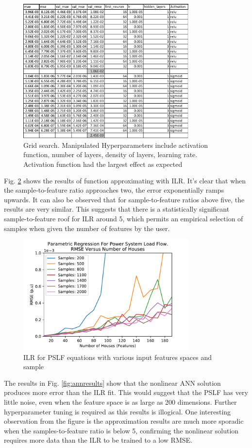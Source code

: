\documentclass[conference]{IEEEtran}
\begin{document}
\begin{figure}[h]
	\centering
	\includegraphics[width=9cm]{gridsearch.pdf}
	\caption{Grid search. Manipulated Hyperparameters include activation function, number of layers, density of layers, learning rate. Activation function had the largest effect as expected}
	\label{fig:gridsearch}
\end{figure}

Fig. \ref{fig:ilrresults} shows the results of function approximating with ILR. It's clear that when the sample-to-feature ratio approaches two, the error exponentially ramps upwards. It can also be observed that for sample-to-feature ratios above five, the results are very similar. This suggests that there is a statistically significant sample-to-feature roof for ILR around 5, which permits an empirical selection of samples when given the number of features by the user.

\begin{figure}[h]
	\centering
	\includegraphics[width=9cm]{ilrrmsevsfeatures_familyofcurves.pdf}
	\caption{ILR for PSLF equations with various input features spaces and sample}
	\label{fig:ilrresults}
\end{figure}

The results in Fig. \ref{fig:annresults} show that the nonlinear ANN solution produces more error than the ILR fit. This would suggest that the PSLF has very little noise, even when the feature space is as large as 200 dimensions. Further hyperparameter tuning is required as this results is illogical. One interesting observation from the figure is the approximation results are much more sporadic when the samples-to-feature ratio is below 5, confirming the nonlinear solution requires more data than the ILR to be trained to a low RMSE.
\end{document}
